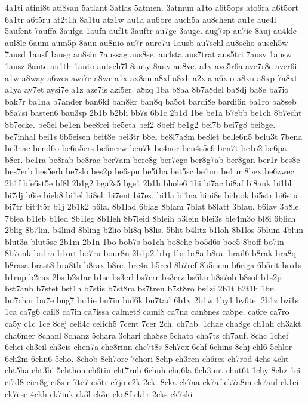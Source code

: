 {4a1ti
atini8t
ati8san
5atlant
3atlas
5atmen.
3atmun
a1to
a6t5ops
ato6ra
a6t5ort
6a1tr
a6t5ru
at2t1h
8a1tu
atz1w
au1a
au6bre
auch5a
au8chent
au1e
aue4l
5aufent
7auffa
3aufga
1aufn
auf1t
3auftr
au7ge
3auge.
aug7sp
au7ie
8auj
au4kle
aul8le
6aum
aum5p
8aun
au8nio
au7r
aure7u
1ausb
au7schl
au8scho
ausch5w
7ausd
1ausf
1ausg
au8sin
7aussag
aus8se.
au4sta
aus7trat
aus5tri
7ausv
1ausw
1ausz
8aute
au1th
1auto
autsch7l
8auty
8auv
au8ve.
a1v
ave5r6a
ave7r8e
aver6i
a1w
a8way
a6wes
awi7e
a8wr
a1x
ax8an
a8xf
a8xh
a2xia
a6xio
a8xn
a8xp
7a8xt
a1ya
ay7et
aysi7e
a1z
aze7is
azi5er.
a8zq
1ba
b8aa
8b7a8del
ba8dj
ba8e
ba7io
bak7r
ba1na
b7ander
ban6kl
ban8kr
ban8q
ba5ot
bardi8e
bardi6n
ba1ro
ba8seb
b8a7si
basten6
bau3sp
2b1b
b2bli
bb7s
6b1c
2b1d
1be
be1a
b7ebb
be1ch
8b7echt
8b7ecke.
be5el
be1en
bee8rei
be5eta
bef2
8beff
be1g2
bei7b
bei7g8
bei8ge.
be7inhal
bei1s
6b5eisen
beit8e
bei3tr
b8el
be8l7a8m
be8let
belle6n5
belu3t
7bena
be3nac
bend6o
be6n5ers
be6nerw
ben7k
be4nor
ben4s5e6
ben7t
be1o2
be6pa
b8er.
be1ra
be8rab
be8rac
ber7am
bere8g
ber7ege
ber8g7ab
ber8gan
ber1r
bes8c
bes7erb
bes5erh
be7slo
bes2p
be6spu
be5tha
bet5sc
be1un
be1ur
8bex
be6zwec
2b1f
bfe6st5e
bf8l
2b1g2
bga2s5
bge1
2b1h
bhole6
1bi
bi7ac
bi8af
bi8ank
bi1bl
bi7dj
b6ie
bieb8
bi1el
bi8el.
bi7ent
bi7es.
bi1la
bi1na
bini8e
bi4nok
bi5str
bi6stu
bi7tr
bit4t5r
b1j
2b1k2
b6la.
8b1lad
6blag
8blam
7blat
b8latt
3blau.
b6lav
3b8le.
7blea
b1leb
b1led
8b1leg
8b1leh
8b7leid
8bleih
b3lein
blei3s
ble4m3o
bl8i
6blich
2blig
8b7lin.
b4lind
8bling
b2lio
bli8q
b8lis.
5blit
b4litz
b1loh
8b1los
5blum
4blun
blut3a
blut5sc
2b1m
2b1n
1bo
bob7s
bo1ch
bo8che
bo5d6s
boe5
8boff
bo7in
8b7onk
bo1ra
b1ort
bo7ru
bour8n
2b1p2
b1q
1br
br8a
b8ra.
brail6
b8rak
bra8q
b8rasa
brast8
bra8th
b8rax
b8re.
bre4a
b5red
8b7ref
8b5riem
b6riga
6b5rit
bro1s
b1rup
b2ruz
2bs
b2s1ar
b1sc
bs3erl
bs7err
bs3erz
bs6ku
b8s7ob
b8sof
b1s2p
bst7anb
b7stet
bst1h
b7stis
b7st8ra
bs7treu
b7st8ro
bs4zi
2b1t
b2t1h
1bu
bu7char
bu7e
bug7
bu1ie
bu7in
bul6k
bu7tad
6b1v
2b1w
1by1
by6te.
2b1z
bzi1s
1ca
ca7g6
cail8
ca7in
ca7issa
calmet8
cami8
ca7na
can8nes
ca8pe.
ca6re
ca7ro
ca5y
c1c
1ce
8cej
celi4c
celich5
7cent
7cer
2ch.
ch7ab.
1chae
cha8ge
ch1ah
ch3akt
cha6mer
8chanl
8chanz
5chara
3chari
cha8se
5chato
cha7ts
ch7auf.
8chc
1chef
6chei
ch3eil
ch3eis
chen7a
che8rinn
che7t8s
8ch7ex
6chf
6chins
8chj
chl6
5chlor
6ch2m
6chn6
5cho.
8chob
8ch7orc
7chori
8chp
ch3ren
ch6res
ch7rod
4chs
4cht
cht5ha
cht3hi
5chthon
ch6tin
cht7ruh
6chuh
chu6la
6ch3unt
chut6t
1chy
8chz
1ci
ci7d8
cier8g
ci8s
ci7te7
ci5tr
c7jo
c2k
2ck.
8cka
ck7aa
ck7af
ck7a8m
ck7auf
ck1ei
ck7ese
4ckh
ck7ink
ck3l
ck3n
cko8f
ck1r
2cks
ck7ski
}
